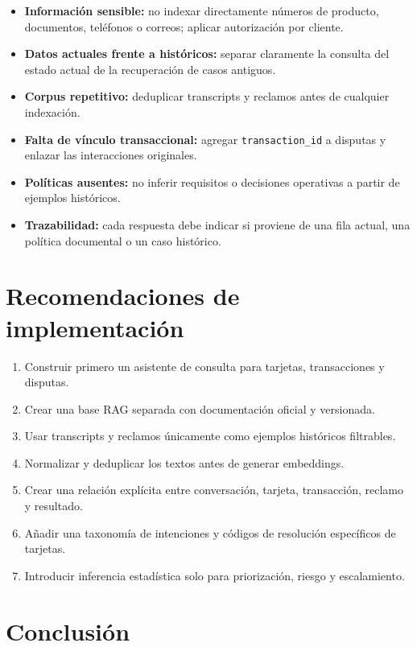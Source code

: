 \documentclass[11pt,a4paper]{article}
\begin{document}
\begin{itemize}
  \item \textbf{Información sensible:} no indexar directamente números de producto, documentos, teléfonos o correos; aplicar autorización por cliente.
  \item \textbf{Datos actuales frente a históricos:} separar claramente la consulta del estado actual de la recuperación de casos antiguos.
  \item \textbf{Corpus repetitivo:} deduplicar transcripts y reclamos antes de cualquier indexación.
  \item \textbf{Falta de vínculo transaccional:} agregar \texttt{transaction\_id} a disputas y enlazar las interacciones originales.
  \item \textbf{Políticas ausentes:} no inferir requisitos o decisiones operativas a partir de ejemplos históricos.
  \item \textbf{Trazabilidad:} cada respuesta debe indicar si proviene de una fila actual, una política documental o un caso histórico.
\end{itemize}

\section{Recomendaciones de implementación}

\begin{enumerate}
  \item Construir primero un asistente de consulta para tarjetas, transacciones y disputas.
  \item Crear una base RAG separada con documentación oficial y versionada.
  \item Usar transcripts y reclamos únicamente como ejemplos históricos filtrables.
  \item Normalizar y deduplicar los textos antes de generar embeddings.
  \item Crear una relación explícita entre conversación, tarjeta, transacción, reclamo y resultado.
  \item Añadir una taxonomía de intenciones y códigos de resolución específicos de tarjetas.
  \item Introducir inferencia estadística solo para priorización, riesgo y escalamiento.
\end{enumerate}

\section{Conclusión}
\end{document}
